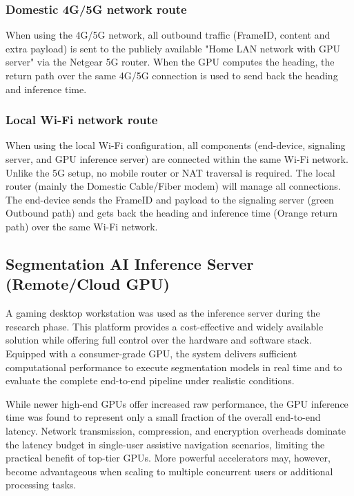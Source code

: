 \documentclass{ieeeaccess}
\begin{document}
\subsubsection{Domestic 4G/5G network route}
When using the 4G/5G network, all outbound traffic (FrameID, content and extra payload) is sent to the publicly available "Home LAN network with GPU server" via the Netgear 5G router.  
When the GPU computes the heading, the return path over the same 4G/5G connection is used to send back the heading and inference time.   


\subsubsection{Local Wi-Fi network route}
\label{sec:benchmarklocal}
When using the local Wi-Fi configuration, all components (end-device, signaling server, and GPU inference server) are connected within the same Wi-Fi network. Unlike the 5G setup, no mobile router or NAT traversal is required. The local router (mainly the Domestic Cable/Fiber modem) will manage all connections. The end-device sends the FrameID and payload to the signaling server (green Outbound path) and gets back the heading and inference time (Orange return path) over the same Wi-Fi network.

\subsection{Segmentation AI Inference Server (Remote/Cloud GPU)}

A gaming desktop workstation was used as the inference server during the research phase. This platform provides a cost-effective and widely available solution while offering full control over the hardware and software stack. Equipped with a consumer-grade GPU, the system delivers sufficient computational performance to execute segmentation models in real time and to evaluate the complete end-to-end pipeline under realistic conditions.

While newer high-end GPUs offer increased raw performance, the GPU inference time was found to represent only a small fraction of the overall end-to-end latency. Network transmission, compression, and encryption overheads dominate the latency budget in single-user assistive navigation scenarios, limiting the practical benefit of top-tier GPUs. More powerful accelerators may, however, become advantageous when scaling to multiple concurrent users or additional processing tasks.
\end{document}
